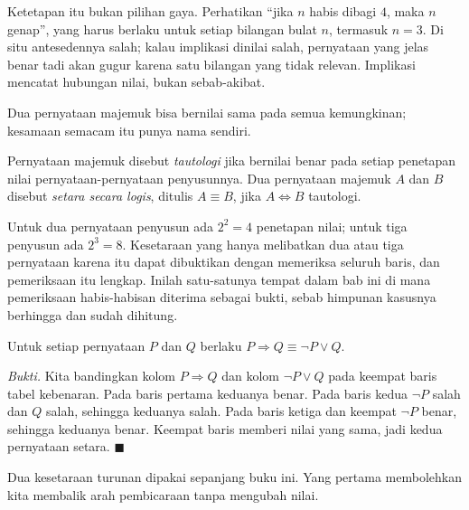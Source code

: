 Ketetapan itu bukan pilihan gaya. Perhatikan ``jika $n$ habis dibagi $4$, maka $n$
genap'', yang harus berlaku untuk setiap bilangan bulat $n$, termasuk $n=3$. Di situ
antesedennya salah; kalau implikasi dinilai salah, pernyataan yang jelas benar tadi akan
gugur karena satu bilangan yang tidak relevan. Implikasi mencatat hubungan nilai, bukan
sebab-akibat.


Dua pernyataan majemuk bisa bernilai sama pada semua kemungkinan; kesamaan semacam itu
punya nama sendiri.

\begin{definisi}
Pernyataan majemuk disebut \emph{tautologi} jika bernilai benar pada setiap penetapan
nilai pernyataan-pernyataan penyusunnya. Dua pernyataan majemuk $A$ dan $B$ disebut
\emph{setara secara logis}, ditulis $A \equiv B$, jika $A \Leftrightarrow B$ tautologi.
\end{definisi}

Untuk dua pernyataan penyusun ada $2^{2}=4$ penetapan nilai; untuk tiga penyusun ada
$2^{3}=8$. Kesetaraan yang hanya melibatkan dua atau tiga pernyataan karena itu dapat
dibuktikan dengan memeriksa seluruh baris, dan pemeriksaan itu lengkap. Inilah satu-satunya tempat dalam bab ini di mana
pemeriksaan habis-habisan diterima sebagai bukti, sebab himpunan kasusnya berhingga dan
sudah dihitung.

\begin{proposisi}
Untuk setiap pernyataan $P$ dan $Q$ berlaku $P \Rightarrow Q \equiv \neg P \vee Q$.
\end{proposisi}
\par\smallskip\noindent\textit{Bukti.} Kita bandingkan kolom $P \Rightarrow Q$ dan kolom $\neg P \vee Q$ pada keempat baris
tabel kebenaran. Pada baris pertama keduanya benar. Pada baris kedua $\neg P$ salah dan
$Q$ salah, sehingga keduanya salah. Pada baris ketiga dan keempat $\neg P$ benar,
sehingga keduanya benar. Keempat baris memberi nilai yang sama, jadi kedua pernyataan
setara.
\hfill$\blacksquare${\parfillskip=0pt\par}

Dua kesetaraan turunan dipakai sepanjang buku ini. Yang pertama membolehkan kita membalik
arah pembicaraan tanpa mengubah nilai.

